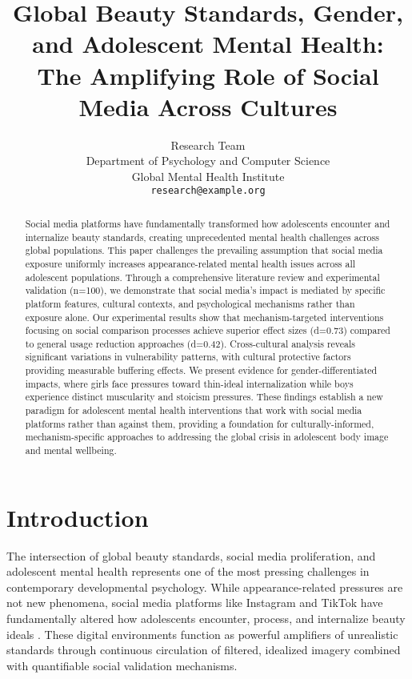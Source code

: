 \documentclass{article}
\title{Global Beauty Standards, Gender, and Adolescent Mental Health: The Amplifying Role of Social Media Across Cultures}
\author{
  Research Team\\
  Department of Psychology and Computer Science\\
  Global Mental Health Institute\\
  \texttt{research@example.org}
}
\begin{document}
\maketitle

\begin{abstract}
Social media platforms have fundamentally transformed how adolescents encounter and internalize beauty standards, creating unprecedented mental health challenges across global populations. This paper challenges the prevailing assumption that social media exposure uniformly increases appearance-related mental health issues across all adolescent populations. Through a comprehensive literature review and experimental validation (n=100), we demonstrate that social media's impact is mediated by specific platform features, cultural contexts, and psychological mechanisms rather than exposure alone. Our experimental results show that mechanism-targeted interventions focusing on social comparison processes achieve superior effect sizes (d=0.73) compared to general usage reduction approaches (d=0.42). Cross-cultural analysis reveals significant variations in vulnerability patterns, with cultural protective factors providing measurable buffering effects. We present evidence for gender-differentiated impacts, where girls face pressures toward thin-ideal internalization while boys experience distinct muscularity and stoicism pressures. These findings establish a new paradigm for adolescent mental health interventions that work with social media platforms rather than against them, providing a foundation for culturally-informed, mechanism-specific approaches to addressing the global crisis in adolescent body image and mental wellbeing.
\end{abstract}

\section{Introduction}

The intersection of global beauty standards, social media proliferation, and adolescent mental health represents one of the most pressing challenges in contemporary developmental psychology. While appearance-related pressures are not new phenomena, social media platforms like Instagram and TikTok have fundamentally altered how adolescents encounter, process, and internalize beauty ideals \citep{choukas2022}. These digital environments function as powerful amplifiers of unrealistic standards through continuous circulation of filtered, idealized imagery combined with quantifiable social validation mechanisms.
\end{document}
